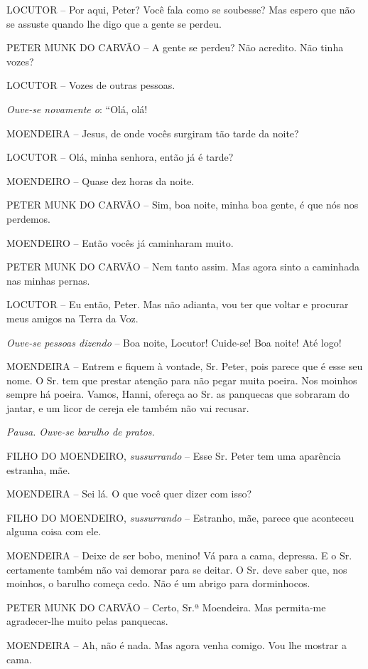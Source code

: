 LOCUTOR -- Por aqui, Peter? Você fala como se soubesse? Mas espero que
não se assuste quando lhe digo que a gente se perdeu.

PETER MUNK DO CARVÃO -- A gente se perdeu? Não acredito. Não tinha
vozes?

LOCUTOR -- Vozes de outras pessoas.

\emph{Ouve-se novamente o}: ``Olá, olá!

MOENDEIRA -- Jesus, de onde vocês surgiram tão tarde da noite?

LOCUTOR -- Olá, minha senhora, então já é tarde?

MOENDEIRO -- Quase dez horas da noite.

PETER MUNK DO CARVÃO -- Sim, boa noite, minha boa gente, é que nós nos
perdemos.

MOENDEIRO -- Então vocês já caminharam muito.

PETER MUNK DO CARVÃO -- Nem tanto assim. Mas agora sinto a caminhada nas
minhas pernas.

LOCUTOR -- Eu então, Peter. Mas não adianta, vou ter que voltar e
procurar meus amigos na Terra da Voz.

\emph{Ouve-se pessoas dizendo} -- Boa noite, Locutor! Cuide-se! Boa
noite! Até logo!

MOENDEIRA -- Entrem e fiquem à vontade, Sr. Peter, pois parece que é
esse seu nome. O Sr. tem que prestar atenção para não pegar muita
poeira. Nos moinhos sempre há poeira. Vamos, Hanni, ofereça ao Sr. as
panquecas que sobraram do jantar, e um licor de cereja ele também não
vai recusar.

\emph{Pausa. Ouve-se barulho de pratos.}

FILHO DO MOENDEIRO, \emph{sussurrando} -- Esse Sr. Peter tem uma
aparência estranha, mãe.

MOENDEIRA -- Sei lá. O que você quer dizer com isso?

FILHO DO MOENDEIRO, \emph{sussurrando} -- Estranho, mãe, parece que
aconteceu alguma coisa com ele.

MOENDEIRA -- Deixe de ser bobo, menino! Vá para a cama, depressa. E o
Sr. certamente também não vai demorar para se deitar. O Sr. deve saber
que, nos moinhos, o barulho começa cedo. Não é um abrigo para
dorminhocos.

PETER MUNK DO CARVÃO -- Certo, Sr.ª Moendeira. Mas permita-me
agradecer-lhe muito pelas panquecas.

MOENDEIRA -- Ah, não é nada. Mas agora venha comigo. Vou lhe mostrar a
cama.


